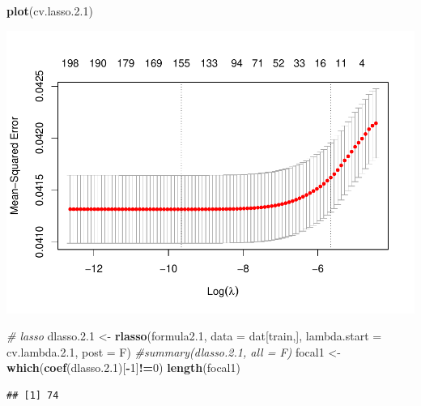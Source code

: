 \documentclass[
]{article}
\newenvironment{Shaded}{\begin{snugshade}}{\end{snugshade}}
\newcommand{\CommentTok}[1]{\textcolor[rgb]{0.56,0.35,0.01}{\textit{#1}}}
\newcommand{\DataTypeTok}[1]{\textcolor[rgb]{0.13,0.29,0.53}{#1}}
\newcommand{\DecValTok}[1]{\textcolor[rgb]{0.00,0.00,0.81}{#1}}
\newcommand{\FloatTok}[1]{\textcolor[rgb]{0.00,0.00,0.81}{#1}}
\newcommand{\KeywordTok}[1]{\textcolor[rgb]{0.13,0.29,0.53}{\textbf{#1}}}
\newcommand{\NormalTok}[1]{#1}
\newcommand{\OperatorTok}[1]{\textcolor[rgb]{0.81,0.36,0.00}{\textbf{#1}}}
\newcommand{\StringTok}[1]{\textcolor[rgb]{0.31,0.60,0.02}{#1}}
\begin{document}
\begin{Shaded}
\begin{Highlighting}[]
\KeywordTok{plot}\NormalTok{(cv.lasso.}\FloatTok{2.1}\NormalTok{)}
\end{Highlighting}
\end{Shaded}

\includegraphics{dlassoMarkdown_files/figure-latex/unnamed-chunk-2-2.pdf}

\begin{Shaded}
\begin{Highlighting}[]
\CommentTok{# lasso}
\NormalTok{dlasso.}\FloatTok{2.1}\NormalTok{ <-}\StringTok{ }\KeywordTok{rlasso}\NormalTok{(formula2}\FloatTok{.1}\NormalTok{, }\DataTypeTok{data =}\NormalTok{ dat[train,], }
                     \DataTypeTok{lambda.start =}\NormalTok{ cv.lambda.}\FloatTok{2.1}\NormalTok{, }\DataTypeTok{post =}\NormalTok{ F)}
\CommentTok{#summary(dlasso.2.1, all = F)}
\NormalTok{focal1 <-}\StringTok{ }\KeywordTok{which}\NormalTok{(}\KeywordTok{coef}\NormalTok{(dlasso.}\FloatTok{2.1}\NormalTok{)[}\OperatorTok{-}\DecValTok{1}\NormalTok{]}\OperatorTok{!=}\DecValTok{0}\NormalTok{)}
\KeywordTok{length}\NormalTok{(focal1)}
\end{Highlighting}
\end{Shaded}

\begin{verbatim}
## [1] 74
\end{verbatim}
\end{document}
